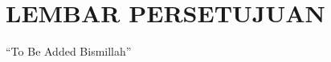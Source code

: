 \chapter*{\uppercase{LEMBAR PERSETUJUAN}}
\vspace{1cm}

\begin{center}
    ``To Be Added Bismillah''
\end{center}

\newpage